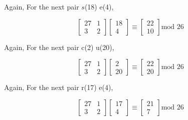 \documentclass[a4paper,12pt]{article}
\begin{document}
    \begin{center}
    \end{center}

    Again, For the next pair $s$(18) e(4),

    \begin{equation*}
        \begin{bmatrix}
            27 & 1 \\
            3 & 2
        \end{bmatrix}
        \begin{bmatrix}
            18 \\
            4
        \end{bmatrix} \equiv \begin{bmatrix}
            22 \\
            10
        \end{bmatrix} \mbox{mod 26}
    \end{equation*}

    \begin{center}
    \end{center}

    Again, For the next pair c(2) u(20),

    \begin{equation*}
        \begin{bmatrix}
            27 & 1 \\
            3 & 2
        \end{bmatrix}
        \begin{bmatrix}
            2 \\
            20
        \end{bmatrix} \equiv \begin{bmatrix}
            22 \\
            20
        \end{bmatrix} \mbox{mod 26}
    \end{equation*}

    \begin{center}
    \end{center}

    Again, For the next pair r(17) e(4),

    \begin{equation*}
        \begin{bmatrix}
            27 & 1 \\
            3 & 2
        \end{bmatrix}
        \begin{bmatrix}
            17 \\
            4
        \end{bmatrix} \equiv \begin{bmatrix}
            21 \\
            7
        \end{bmatrix} \mbox{mod 26}
    \end{equation*}
\end{document}
